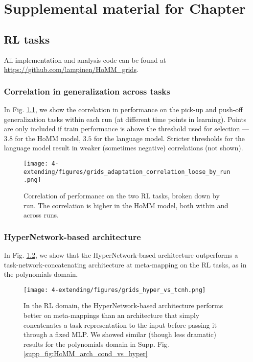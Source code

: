 \chapter{Supplemental material for Chapter } \label{appendix:extending}

\section{RL tasks} \label{app:extending_grids_methods}

All implementation and analysis code can be found at \url{https://github.com/lampinen/HoMM_grids}.\par


\subsection{Correlation in generalization across tasks}
In Fig. \ref{fig:app_extending:RL_correlation_by_run}, we show the correlation in performance on the pick-up and push-off generalization tasks within each run (at different time points in learning). Points are only included if train performance is above the threshold used for selection --- \(3.8\) for the HoMM model, \(3.5\) for the language model. Stricter thresholds for the language model result in weaker (sometimes negative) correlations (not shown). \par 
\begin{figure}
\centering
\texttt{[image: 4-extending/figures/grids\_adaptation\_correlation\_loose\_by\_run.png]}
\caption[Correlation of performance on the RL tasks, by run.]{Correlation of performance on the two RL tasks, broken down by run. The correlation is higher in the HoMM model, both within and across runs.} \label{fig:app_extending:RL_correlation_by_run}
\end{figure}


\subsection{HyperNetwork-based architecture}
In Fig. \ref{supp_fig:extending:RL:arch_cond_vs_hyper}, we show that the HyperNetwork-based architecture outperforms a task-network-concatenating architecture at meta-mapping on the RL tasks, as in the polynomials domain. \par 

\begin{figure}
\centering
\texttt{[image: 4-extending/figures/grids\_hyper\_vs\_tcnh.png]}
\caption[In the RL domain, the HyperNetwork-based architecture performs better on meta-mappings than an architecture that simply concatenates a task representation to the input.]{In the RL domain, the HyperNetwork-based architecture performs better on meta-mappings than an architecture that simply concatenates a task representation to the input before passing it through a fixed MLP. We showed similar (though less dramatic) results for the polynomials domain in Supp. Fig. \ref{supp_fig:HoMM_arch_cond_vs_hyper}}\label{supp_fig:extending:RL:arch_cond_vs_hyper}
\end{figure}


